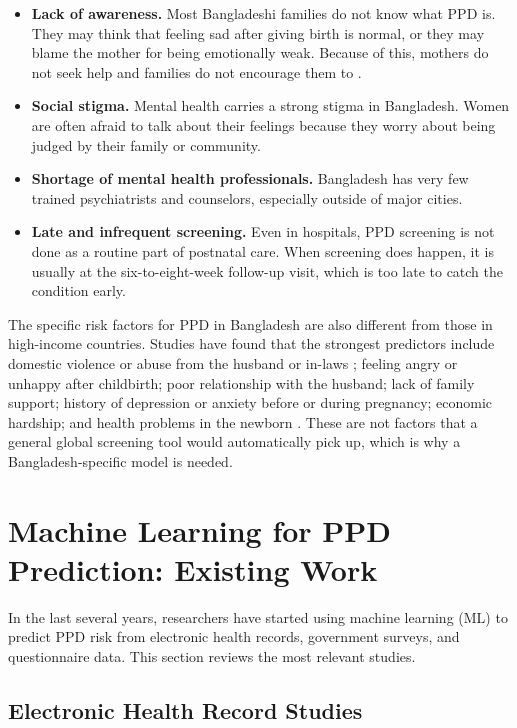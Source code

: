 \begin{itemize}
    \item \textbf{Lack of awareness.} Most Bangladeshi families do not know what PPD is. They may think that feeling sad after giving birth is normal, or they may blame the mother for being emotionally weak. Because of this, mothers do not seek help and families do not encourage them to \cite{shirin2024burden}.
    \item \textbf{Social stigma.} Mental health carries a strong stigma in Bangladesh. Women are often afraid to talk about their feelings because they worry about being judged by their family or community.
    \item \textbf{Shortage of mental health professionals.} Bangladesh has very few trained psychiatrists and counselors, especially outside of major cities.
    \item \textbf{Late and infrequent screening.} Even in hospitals, PPD screening is not done as a routine part of postnatal care. When screening does happen, it is usually at the six-to-eight-week follow-up visit, which is too late to catch the condition early.
\end{itemize}

The specific risk factors for PPD in Bangladesh are also different from those in high-income countries. Studies have found that the strongest predictors include domestic violence or abuse from the husband or in-laws \cite{islam2017ipv}; feeling angry or unhappy after childbirth; poor relationship with the husband; lack of family support; history of depression or anxiety before or during pregnancy; economic hardship; and health problems in the newborn \cite{yazdkhasti2026systematic, shirin2024burden}. These are not factors that a general global screening tool would automatically pick up, which is why a Bangladesh-specific model is needed.

\section{Machine Learning for PPD Prediction: Existing Work}
\label{ch2-sec-existing-work}

In the last several years, researchers have started using machine learning (ML) to predict PPD risk from electronic health records, government surveys, and questionnaire data. This section reviews the most relevant studies.

\subsection{Electronic Health Record Studies}


